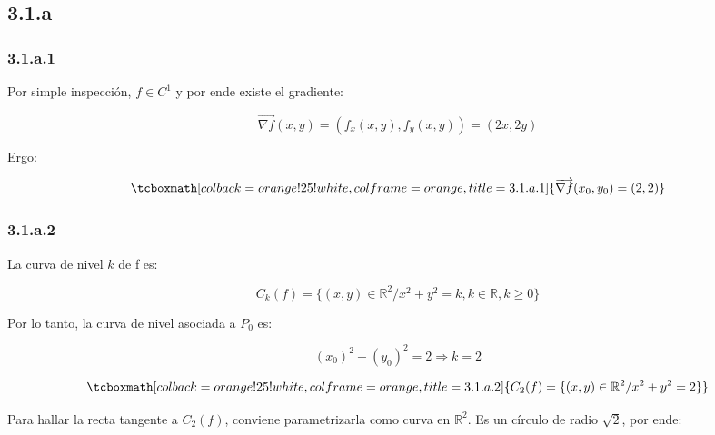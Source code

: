 \documentclass{article}
\renewcommand{\Bbb}{\mathbb}
\begin{document}
\subsection*{3.1.a}
\label{subsec:3.1.a}

\subsubsection*{3.1.a.1}
\label{subsubsec:3.1.a.1}

Por simple inspección, $f \in C^1$ y por ende existe el gradiente:

\begin{equation}
\overrightarrow{ \nabla f }(x,y) = (f_x(x,y), f_y(x,y)) = (2x, 2y)
\end{equation}

Ergo:

\begin{equation}
\tcboxmath[colback=orange!25!white,colframe=orange,title=3.1.a.1]
{
\overrightarrow{ \nabla f }(x_0,y_0) = (2, 2)
}
\end{equation}

\subsubsection*{3.1.a.2}
\label{subsubsec:3.1.a.2}

La curva de nivel $k$ de f es:

\begin{equation}
C_k(f) = \{ (x,y) \in \Bbb R^2 / x^2 + y^2 = k, k \in \Bbb R, k \geq 0 \}
\end{equation}

Por lo tanto, la curva de nivel asociada a $P_0$ es:

\begin{equation}
(x_0)^2 + (y_0)^2 = 2 \Rightarrow k = 2
\end{equation}

\begin{equation}
\tcboxmath[colback=orange!25!white,colframe=orange,title=3.1.a.2]
{
C_2(f) = \{ (x,y) \in \Bbb R^2 / x^2 + y^2 = 2 \}
}
\end{equation}

Para hallar la recta tangente a $C_2(f)$, conviene parametrizarla como curva en $\Bbb R^2$. Es un círculo de radio $\sqrt{2}$, por ende:
\end{document}
